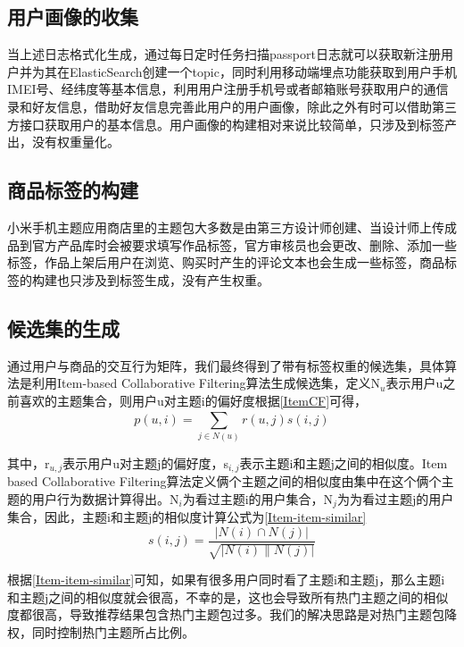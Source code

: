     \subsection{用户画像的收集}
    当上述日志格式化生成，通过每日定时任务扫描passport日志就可以获取新注册用户并为其在ElasticSearch创建一个topic，同时利用移动端埋点功能获取到用户手机IMEI号、经纬度等基本信息，利用用户注册手机号或者邮箱账号获取用户的通信录和好友信息，借助好友信息完善此用户的用户画像，除此之外有时可以借助第三方接口获取用户的基本信息。用户画像的构建相对来说比较简单，只涉及到标签产出，没有权重量化。

    \subsection{商品标签的构建}
    小米手机主题应用商店里的主题包大多数是由第三方设计师创建、当设计师上传成品到官方产品库时会被要求填写作品标签，官方审核员也会更改、删除、添加一些标签，作品上架后用户在浏览、购买时产生的评论文本也会生成一些标签，商品标签的构建也只涉及到标签生成，没有产生权重。

    \subsection{候选集的生成}
    通过用户与商品的交互行为矩阵，我们最终得到了带有标签权重的候选集，具体算法是利用Item-based Collaborative Filtering算法生成候选集，定义N$_u$表示用户u之前喜欢的主题集合，则用户u对主题i的偏好度根据\autoref{ItemCF}可得，
    \begin{equation}
    p(u,i)=\sum \limits _{j\in N(u)}^{} r(u,j)s(i,j)
    \label{ItemCF}
    \end{equation}

    其中，r$_{u,j}$表示用户u对主题j的偏好度，s$_{i,j}$表示主题i和主题j之间的相似度。Item based Collaborative Filtering算法定义俩个主题之间的相似度由集中在这个俩个主题的用户行为数据计算得出。N$_{i}$为看过主题i的用户集合，N$_{j}$为为看过主题j的用户集合，因此，主题i和主题j的相似度计算公式为\autoref{Item-item-similar}
    \begin{equation}
    s(i,j)=\frac{\left | N(i)\cap N(j) \right |}{\sqrt{\left | N(i) \parallel N(j) \right |}}
    \label{Item-item-similar}
    \end{equation}

    根据\autoref{Item-item-similar}可知，如果有很多用户同时看了主题i和主题j，那么主题i和主题j之间的相似度就会很高，不幸的是，这也会导致所有热门主题之间的相似度都很高，导致推荐结果包含热门主题包过多。我们的解决思路是对热门主题包降权，同时控制热门主题所占比例。

